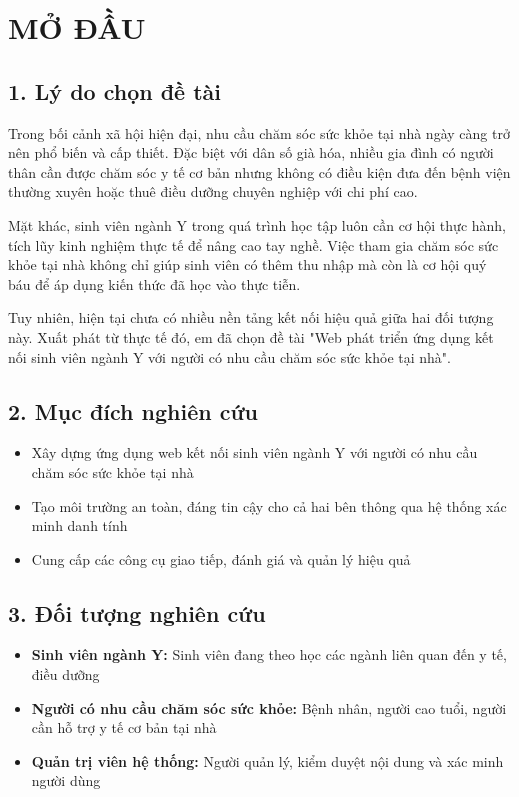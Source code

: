 \documentclass[12pt,a4paper]{report}
\begin{document}
\newpage

\chapter*{MỞ ĐẦU}

\section*{1. Lý do chọn đề tài}

Trong bối cảnh xã hội hiện đại, nhu cầu chăm sóc sức khỏe tại nhà ngày càng trở nên phổ biến và cấp thiết. Đặc biệt với dân số già hóa, nhiều gia đình có người thân cần được chăm sóc y tế cơ bản nhưng không có điều kiện đưa đến bệnh viện thường xuyên hoặc thuê điều dưỡng chuyên nghiệp với chi phí cao.

Mặt khác, sinh viên ngành Y trong quá trình học tập luôn cần cơ hội thực hành, tích lũy kinh nghiệm thực tế để nâng cao tay nghề. Việc tham gia chăm sóc sức khỏe tại nhà không chỉ giúp sinh viên có thêm thu nhập mà còn là cơ hội quý báu để áp dụng kiến thức đã học vào thực tiễn.

Tuy nhiên, hiện tại chưa có nhiều nền tảng kết nối hiệu quả giữa hai đối tượng này. Xuất phát từ thực tế đó, em đã chọn đề tài "Web phát triển ứng dụng kết nối sinh viên ngành Y với người có nhu cầu chăm sóc sức khỏe tại nhà".

\section*{2. Mục đích nghiên cứu}

\begin{itemize}
    \item Xây dựng ứng dụng web kết nối sinh viên ngành Y với người có nhu cầu chăm sóc sức khỏe tại nhà
    \item Tạo môi trường an toàn, đáng tin cậy cho cả hai bên thông qua hệ thống xác minh danh tính
    \item Cung cấp các công cụ giao tiếp, đánh giá và quản lý hiệu quả
\end{itemize}

\section*{3. Đối tượng nghiên cứu}

\begin{itemize}
    \item \textbf{Sinh viên ngành Y:} Sinh viên đang theo học các ngành liên quan đến y tế, điều dưỡng
    \item \textbf{Người có nhu cầu chăm sóc sức khỏe:} Bệnh nhân, người cao tuổi, người cần hỗ trợ y tế cơ bản tại nhà
    \item \textbf{Quản trị viên hệ thống:} Người quản lý, kiểm duyệt nội dung và xác minh người dùng
\end{itemize}
\end{document}
